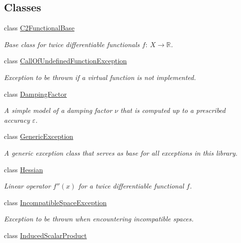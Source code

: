 \subsection*{Classes}
\begin{DoxyCompactItemize}
\item 
class \hyperlink{classSpacy_1_1C2FunctionalBase}{C2\+Functional\+Base}
\begin{DoxyCompactList}\small\item\em Base class for twice differentiable functionals $ f:\ X\rightarrow \mathbb{R}$. \end{DoxyCompactList}\item 
class \hyperlink{classSpacy_1_1CallOfUndefinedFunctionException}{Call\+Of\+Undefined\+Function\+Exception}
\begin{DoxyCompactList}\small\item\em Exception to be thrown if a virtual function is not implemented. \end{DoxyCompactList}\item 
class \hyperlink{classSpacy_1_1DampingFactor}{Damping\+Factor}
\begin{DoxyCompactList}\small\item\em A simple model of a damping factor $\nu$ that is computed up to a prescribed accuracy $\varepsilon$. \end{DoxyCompactList}\item 
class \hyperlink{classSpacy_1_1GenericException}{Generic\+Exception}
\begin{DoxyCompactList}\small\item\em A generic exception class that serves as base for all exceptions in this library. \end{DoxyCompactList}\item 
class \hyperlink{classSpacy_1_1Hessian}{Hessian}
\begin{DoxyCompactList}\small\item\em Linear operator $f''(x)$ for a twice differentiable functional $f$. \end{DoxyCompactList}\item 
class \hyperlink{classSpacy_1_1IncompatibleSpaceException}{Incompatible\+Space\+Exception}
\begin{DoxyCompactList}\small\item\em Exception to be thrown when encountering incompatible spaces. \end{DoxyCompactList}\item 
class \hyperlink{classSpacy_1_1InducedScalarProduct}{Induced\+Scalar\+Product}

\end{DoxyCompactItemize}
